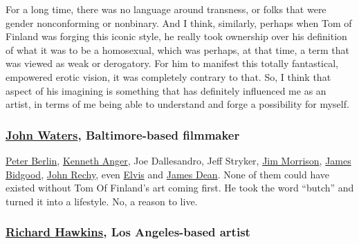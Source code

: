 For a long time, there was no language around transness, or folks that
were gender nonconforming or nonbinary. And I think, similarly, perhaps
when Tom of Finland was forging this iconic style, he really took
ownership over his definition of what it was to be a homosexual, which
was perhaps, at that time, a term that was viewed as weak or derogatory.
For him to manifest this totally fantastical, empowered erotic vision,
it was completely contrary to that. So, I think that aspect of his
imagining is something that has definitely influenced me as an artist,
in terms of me being able to understand and forge a possibility for
myself.

\hypertarget{john-waters-baltimore-based-filmmaker}{%
\subsubsection{\texorpdfstring{\textbf{\href{https://www.nytimes.com/2015/11/20/t-magazine/my-10-favorite-books-john-waters.html}{John
Waters}, Baltimore-based
filmmaker}}{John Waters, Baltimore-based filmmaker}}\label{john-waters-baltimore-based-filmmaker}}

\href{https://www.nytimes.com/2019/11/27/style/peter-berlin-the-70s-gay-sex-symbol-takes-new-york.html}{Peter
Berlin}, \href{https://www.kennethanger.org/}{Kenneth Anger}, Joe
Dallesandro, Jeff Stryker,
\href{https://www.nytimes.com/1971/07/09/archives/jim-morrison-25-lead-singer-with-doors-rock-group-dies.html}{Jim
Morrison},
\href{https://www.nytimes.com/2011/03/20/magazine/mag-20Bidgood-t.html}{James
Bidgood},
\href{https://www.nytimes.com/2013/12/01/us/a-first-gay-novel-a-poor-latino-boyhood-and-the-confluence.html}{John
Rechy}, even
\href{https://www.nytimes.com/topic/person/elvis-presley}{Elvis} and
\href{https://www.nytimes.com/topic/person/james-dean}{James Dean}. None
of them could have existed without Tom Of Finland's art coming first. He
took the word ``butch'' and turned it into a lifestyle. No, a reason to
live.

\hypertarget{richard-hawkins-los-angeles-based-artist}{%
\subsubsection{\texorpdfstring{\textbf{\href{https://tmagazine.blogs.nytimes.com/2010/05/27/seeing-things-richard-hawkinss-haunted-houses/}{Richard
Hawkins}, Los Angeles-based
artist}}{Richard Hawkins, Los Angeles-based artist}}\label{richard-hawkins-los-angeles-based-artist}}


